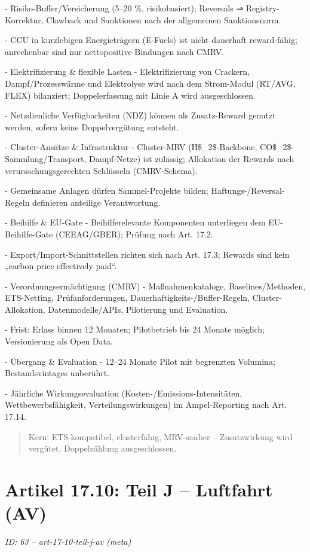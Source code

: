 \documentclass[12pt,a4paper]{scrartcl}
\begin{document}
- Risiko-Buffer/Versicherung (5--20 \%, risikobasiert); Reversals ⇒ Registry-Korrektur, Clawback und Sanktionen nach der allgemeinen Sanktionsnorm.

- CCU in kurzlebigen Energieträgern (E-Fuels) ist nicht dauerhaft reward-fähig; anrechenbar sind nur nettopositive Bindungen nach CMRV.

- Elektrifizierung \& flexible Lasten
- Elektrifizierung von Crackern, Dampf/Prozesswärme und Elektrolyse wird nach dem Strom-Modul (RT/AVG, FLEX) bilanziert; Doppelerfassung mit Linie A wird ausgeschlossen.

- Netzdienliche Verfügbarkeiten (NDZ) können als Zusatz-Reward genutzt werden, sofern keine Doppelvergütung entsteht.

- Cluster-Ansätze \& Infrastruktur
- Cluster-MRV (H\$\_2\$-Backbone, CO\$\_2\$-Sammlung/Transport, Dampf-Netze) ist zulässig; Allokation der Rewards nach verursachungsgerechten Schlüsseln (CMRV-Schema).

- Gemeinsame Anlagen dürfen Sammel-Projekte bilden; Haftungs-/Reversal-Regeln definieren anteilige Verantwortung.

- Beihilfe \& EU-Gate
- Beihilferelevante Komponenten unterliegen dem EU-Beihilfe-Gate (CEEAG/GBER); Prüfung nach Art. 17.2.

- Export/Import-Schnittstellen richten sich nach Art. 17.3; Rewards sind kein „carbon price effectively paid“.

- Verordnungsermächtigung (CMRV)
- Maßnahmenkataloge, Baselines/Methoden, ETS-Netting, Prüfanforderungen, Dauerhaftigkeits-/Buffer-Regeln, Cluster-Allokation, Datenmodelle/APIs, Pilotierung und Evaluation.

- Frist: Erlass binnen 12 Monaten; Pilotbetrieb bis 24 Monate möglich; Versionierung als Open Data.

- Übergang \& Evaluation
- 12--24 Monate Pilot mit begrenzten Volumina; Bestandsvintages unberührt.

- Jährliche Wirkungsevaluation (Kosten-/Emissions-Intensitäten, Wettbewerbsfähigkeit, Verteilungswirkungen) im Ampel-Reporting nach Art. 17.14.

{\footnotesize\begin{quote}
Kern: ETS-kompatibel, clusterfähig, MRV-sauber -- Zusatzwirkung wird vergütet, Doppelzählung ausgeschlossen.
\end{quote}}



\section[Artikel 17.10: Teil J -- Luftfahrt (AV)]{Artikel 17.10: Teil J -- Luftfahrt (AV)}
\noindent\textit{ID: 63 -- art-17-10-teil-j-av (meta)}
\end{document}
